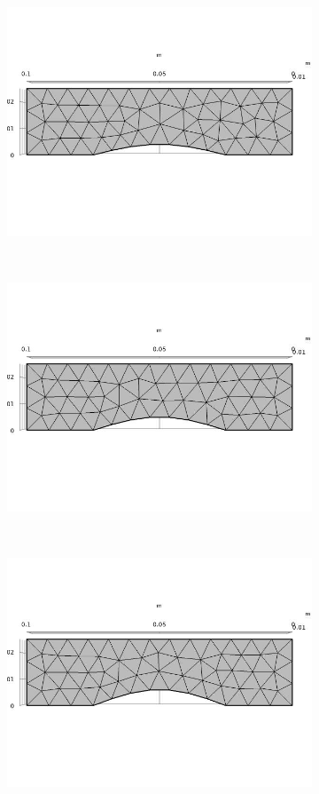 \documentclass[a4paper]{article}
\begin{document}
\begin{figure}[h]
	\begin{subfigure}{0.22\linewidth}
		\centering
		\includegraphics[width=0.95\linewidth]{04.jpg}
	\end{subfigure}
	~
	\begin{subfigure}{0.22\linewidth}
		\centering
		\includegraphics[width=0.95\linewidth]{05.jpg}
	\end{subfigure}
	~
	\begin{subfigure}{0.22\linewidth}
		\centering
		\includegraphics[width=0.95\linewidth]{06.jpg}
	\end{subfigure}


\end{figure}
\end{document}
